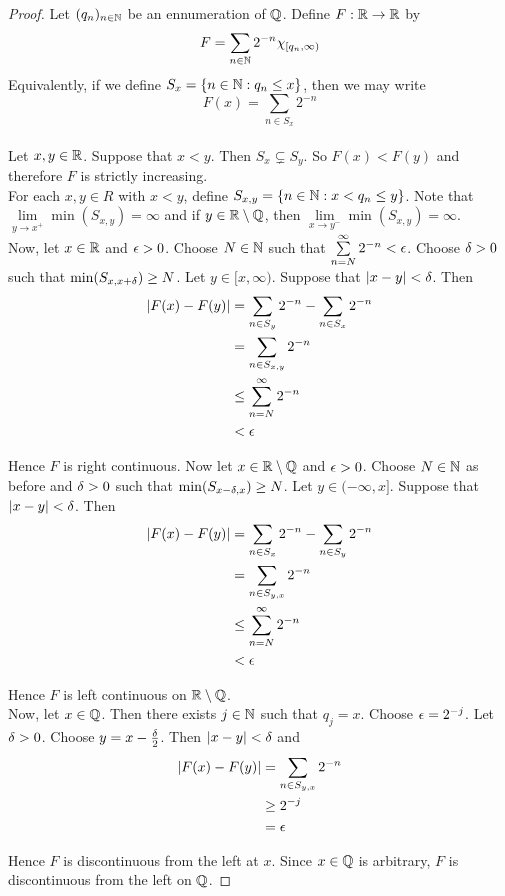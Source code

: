 \documentclass{book}
\begin{document}
	\begin{proof}
		Let $(q_n)_{n\in \mathbb{N}}$ be an ennumeration of $\mathbb{Q}$. Define $F:\mathbb{R} \rightarrow \mathbb{R}$ by $$F =\sum_{n\in \mathbb{N}} 2^{-n}\chi_{[q_n, \infty)}$$ 
		Equivalently, if we define $S_x=\{n \in \mathbb{N}: q_n \leq x\}$, then we may write $$F(x) = \sum_{n \in S_x}2^{-n}$$\\ Let $x, y \in \mathbb{R}$. Suppose that $x < y$. Then $S_x \subsetneq S_y$. So $F(x)<F(y)$ and therefore $F$ is strictly increasing.\\ 
		For each $x,y \in R$ with $x<y$, define $S_{x,y}= \{n \in \mathbb{N}:x< q_n \leq y\}$. Note that $\lim\limits_{y\rightarrow x^+}\min(S_{x,y}) = \infty$ and if $y \in \mathbb{R} \setminus \mathbb{Q}$, then $\lim\limits_{x\rightarrow y^-}\min(S_{x,y}) = \infty$.\\
		Now, let $x \in \mathbb{R}$ and $\epsilon>0$. Choose $N \in \mathbb{N}$ such that $\sum\limits_{n = N}^{\infty}2^{-n}<\epsilon$. Choose $\delta>0$ such that $\min (S_{x,x+\delta}) \geq N$.  Let $y \in [x,\infty)$. Suppose that $|x-y| < \delta$. Then 
		\begin{align*}
			|F(x)-F(y)| 
			&= \sum_{n \in S_y}2^{-n} - \sum_{n \in S_x}2^{-n}\\
			& = \sum_{n \in S_{x,y}}2^{-n}\\
			& \leq \sum_{n=N}^{\infty}2^{-n}\\
			&<\epsilon
		\end{align*} 
		
		Hence $F$ is right continuous. Now let $x \in \mathbb{R}\setminus \mathbb{Q}$ and $\epsilon>0$. Choose $N \in \mathbb{N}$ as before and $\delta>0$ such that $\min(S_{x-\delta,x})\geq N$. Let $y \in (-\infty, x]$. Suppose that $|x-y|<\delta$. Then 
		\begin{align*}
			|F(x)-F(y)| 
			&= \sum_{n \in S_x}2^{-n} - \sum_{n \in S_y}2^{-n}\\
			& = \sum_{n \in S_{y,x}}2^{-n}\\
			& \leq \sum_{n=N}^{\infty}2^{-n}\\
			&<\epsilon
		\end{align*}
		
		Hence $F$ is left continuous on $\mathbb{R}\setminus \mathbb{Q}$.\\
		Now, let $x \in \mathbb{Q}$. Then there exists $j \in \mathbb{N}$ such that $q_j=x$. Choose $\epsilon=2^{-j}$. Let $\delta>0$. Choose $y=x-\frac{\delta}{2}$. Then $|x-y|< \delta$ and 
		\begin{align*}
			|F(x)-F(y)|
			&= \sum_{n \in S_{y,x}}2^{-n}\\
			&\geq 2^{-j}\\
			&= \epsilon
		\end{align*}
		
		Hence $F$ is discontinuous from the left at $x$. Since $x \in \mathbb{Q}$ is arbitrary, $F$ is discontinuous from the left on $\mathbb{Q}$.  
	\end{proof}
	
\end{document}
